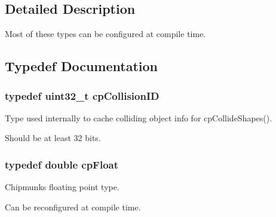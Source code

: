 \subsection{Detailed Description}
Most of these types can be configured at compile time. 



\subsection{Typedef Documentation}
\hypertarget{group__basic_types_ga89d4043ca0567e947aaca19cf9600df5}{}
\subsubsection[{cp\+Collision\+I\+D}]{\setlength{\rightskip}{0pt plus 5cm}typedef uint32\+\_\+t {\bf cp\+Collision\+I\+D}}\label{group__basic_types_ga89d4043ca0567e947aaca19cf9600df5}


Type used internally to cache colliding object info for cp\+Collide\+Shapes(). 

Should be at least 32 bits. \hypertarget{group__basic_types_gac1ed65573e035bf892505768c852d8d3}{}
\subsubsection[{cp\+Float}]{\setlength{\rightskip}{0pt plus 5cm}typedef double {\bf cp\+Float}}\label{group__basic_types_gac1ed65573e035bf892505768c852d8d3}


Chipmunk\textquotesingle{}s floating point type. 

Can be reconfigured at compile time. 